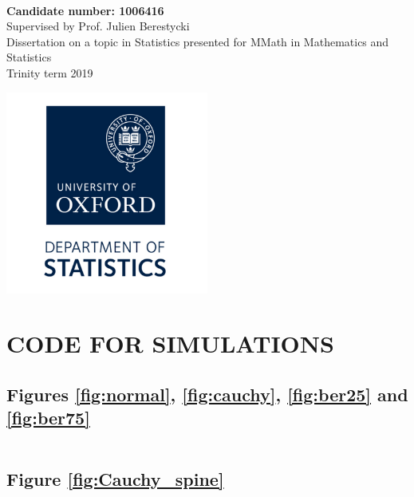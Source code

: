 \documentclass[12pt]{article}
\begin{document}
\begin{titlepage}
   \begin{center}
       \vspace*{1cm}
 
       \textbf{{\color{blue}{\huge Branching Random Walks \\ with Selection}}}
       \vspace{1.5cm} \\
       \textbf{Candidate number: 1006416}
       \vspace{0.5cm} \\
       Supervised by Prof. Julien Berestycki 
       \vspace{0.5cm} \\
       Dissertation on a topic in Statistics \linebreak presented for MMath in Mathematics and Statistics
       \vspace{0.3cm} \\
       Trinity term 2019
       \vfill
 
       \includegraphics[width=0.5\textwidth]{graphics/oxford_logo.png}
 
 
   \end{center}
\end{titlepage}

\tableofcontents
\newpage








\section{CODE FOR SIMULATIONS}

\subsection{Figures \ref{fig:normal}, \ref{fig:cauchy}, \ref{fig:ber25} and \ref{fig:ber75}}
\inputminted[obeytabs=true,tabsize=2]{python}{simulations/simulation(for_show).py}

\subsection{Figure \ref{fig:Cauchy_spine}}
\inputminted[obeytabs=true,tabsize=2]{python}{simulations/PPP_simulation(for_show).py}
\newpage



\end{document}
